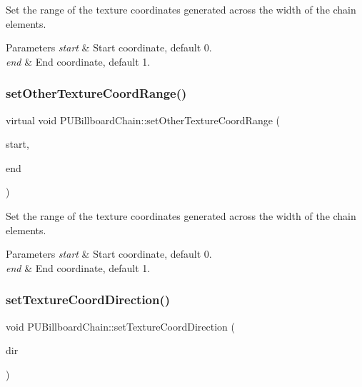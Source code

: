 Set the range of the texture coordinates generated across the width of the chain elements. 
\begin{DoxyParams}{Parameters}
{\em start} & Start coordinate, default 0. \\
\hline
{\em end} & End coordinate, default 1. \\
\hline
\end{DoxyParams}
\mbox{\label{classPUBillboardChain_a391106bfa62a93600afce5bdb94c23a1}} 
\subsubsection{\texorpdfstring{set\+Other\+Texture\+Coord\+Range()}{setOtherTextureCoordRange()}\hspace{0.1cm}{\footnotesize\ttfamily [2/2]}}
{\footnotesize\ttfamily virtual void P\+U\+Billboard\+Chain\+::set\+Other\+Texture\+Coord\+Range (\begin{DoxyParamCaption}\item[{float}]{start,  }\item[{float}]{end }\end{DoxyParamCaption})\hspace{0.3cm}{\ttfamily [virtual]}}

Set the range of the texture coordinates generated across the width of the chain elements. 
\begin{DoxyParams}{Parameters}
{\em start} & Start coordinate, default 0. \\
\hline
{\em end} & End coordinate, default 1. \\
\hline
\end{DoxyParams}
\mbox{\label{classPUBillboardChain_a9d2db6325df125ca6bfad0e1277668dc}} 
\subsubsection{\texorpdfstring{set\+Texture\+Coord\+Direction()}{setTextureCoordDirection()}\hspace{0.1cm}{\footnotesize\ttfamily [1/2]}}
{\footnotesize\ttfamily void P\+U\+Billboard\+Chain\+::set\+Texture\+Coord\+Direction (\begin{DoxyParamCaption}\item[{\hyperlink{classPUBillboardChain_a6ebaec09a615199356b9d50fdab2209f}{P\+U\+Billboard\+Chain\+::\+Tex\+Coord\+Direction}}]{dir }\end{DoxyParamCaption})\hspace{0.3cm}{\ttfamily [virtual]}}

